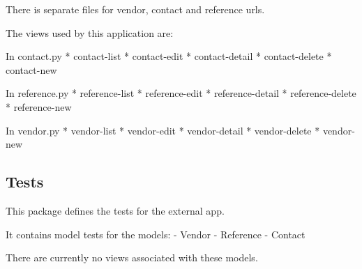 \documentclass[letterpaper,10pt,english]{sphinxmanual}
\begin{document}
There is separate files for vendor, contact and reference urls.

The views used by this application are:

In contact.py
* contact-list
* contact-edit
* contact-detail
* contact-delete
* contact-new

In reference.py
* reference-list
* reference-edit
* reference-detail
* reference-delete
* reference-new

In vendor.py
* vendor-list
* vendor-edit
* vendor-detail
* vendor-delete
* vendor-new


\subsection{Tests}
\label{api:id12}\label{api:module-experimentdb.external.tests}
This package defines the tests for the external app.

It contains model tests for the models:
- Vendor
- Reference
- Contact

There are currently no views associated with these models.
\end{document}
